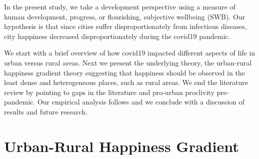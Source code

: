 \documentclass[10pt, letterpaper]{article}
\begin{document}
\begin{spacing}{1.4}





In the present study, we take a development perspective using a measure of human
development, progress, or flourishing, subjective wellbeing (SWB). Our 
 hypothesis is that since cities suffer disproportionately from
infectious diseases, city happiness decreased disproportionately during the
covid19 pandemic.

We start with a brief overview of how covid19 impacted
different aspects of life in urban versus rural areas. Next we present the
underlying theory, the urban-rural happiness gradient theory suggesting that
happiness should be observed in the least dense and heterogeneous places, such
as rural areas. We end the literature review by pointing to gaps in the
literature and pro-urban proclivity pre-pandemic. Our empirical analysis follows
and we conclude with a discussion of results and future research. %



\section{Urban-Rural Happiness Gradient}



\end{spacing}
\end{document}
